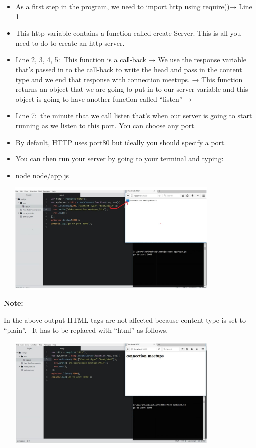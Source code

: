 \documentclass[
]{article}
\providecommand{\tightlist}{%
  \setlength{\itemsep}{0pt}\setlength{\parskip}{0pt}}
\begin{document}
\begin{itemize}
\tightlist
\item
  As a first step in the program, we need to import http using
  require()→ Line 1
\item
  This http variable contains a function called create Server. This is
  all you need to do to create an http server.
\item
  Line 2, 3, 4, 5:~This function is a call-back → We use the response
  variable that's passed in to the call-back to write the head and pass
  in the content type and we end that response with connection meetups.
  → This function returns an object that we are going to put in to our
  server variable and this object is going to have another function
  called ``listen'' →
\item
  Line 7:~the minute that we call listen that's when our server is going
  to start running as we listen to this port. You can choose any port.
\item
  By default, HTTP uses port80 but ideally you should specify a port.
\item
  You can then run your server by going to your terminal and typing:
\item
  node node/app.js
\end{itemize}

\begin{center}
	\includegraphics*[width=4.48in, height=2.13in]{IMG-01-07}
\end{center}


{\textbf{Note:}}{~}

In the above output HTML tags are not affected because content-type is
set to ``plain''.{~ }It has to be replaced with ``html'' as follows.

\begin{center}
	\includegraphics*[width=4.48in, height=2.13in]{IMG-01-08}
\end{center}
\end{document}
